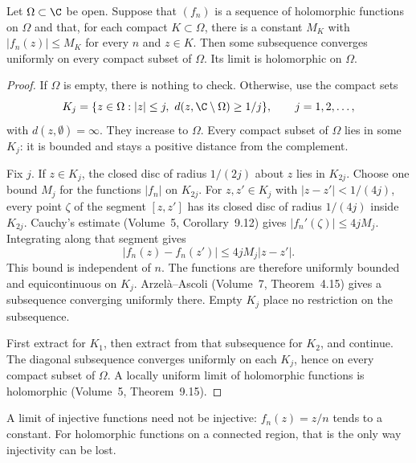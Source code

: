 \begin{theorem}[Montel, 1907]\label{thm:montel}
Let $\Omega\subset\C$ be open. Suppose that $(f_n)$ is a sequence of
holomorphic functions on $\Omega$ and that, for each compact $K\subset\Omega$,
there is a constant $M_K$ with $|f_n(z)|\le M_K$ for every $n$ and $z\in K$.
Then some subsequence converges uniformly on every compact subset of
$\Omega$. Its limit is holomorphic on $\Omega$.
\end{theorem}
\begin{proof}
If $\Omega$ is empty, there is nothing to check. Otherwise, use the compact sets
\[
 K_j=\{z\in\Omega:|z|\le j,\ d(z,\C\setminus\Omega)\ge1/j\},
 \qquad j=1,2,\ldots,
\]
with $d(z,\emptyset)=\infty$. They increase to $\Omega$. Every compact
subset of $\Omega$ lies in some $K_j$: it is bounded and stays a positive
distance from the complement.

Fix $j$. If $z\in K_j$, the closed disc of radius $1/(2j)$ about $z$ lies
in $K_{2j}$. Choose one bound $M_j$ for the functions $|f_n|$ on $K_{2j}$.
For $z,z'\in K_j$ with $|z-z'|<1/(4j)$, every point $\zeta$ of the
segment $[z,z']$ has its closed disc of radius $1/(4j)$ inside $K_{2j}$.
Cauchy's estimate (Volume~5, Corollary~9.12) gives
$|f_n'(\zeta)|\le4jM_j$. Integrating along that segment gives
\[
 |f_n(z)-f_n(z')|\le4jM_j|z-z'|.
\]
This bound is independent of $n$. The functions are therefore uniformly
bounded and equicontinuous on $K_j$. Arzel\`a--Ascoli (Volume~7,
Theorem~4.15) gives a subsequence converging uniformly there. Empty $K_j$
place no restriction on the subsequence.

First extract for $K_1$, then extract from that subsequence for $K_2$, and
continue. The diagonal subsequence converges uniformly on each $K_j$,
hence on every compact subset of $\Omega$. A locally uniform limit of
holomorphic functions is holomorphic (Volume~5, Theorem~9.15).
\end{proof}

A limit of injective functions need not be injective: $f_n(z)=z/n$ tends
to a constant. For holomorphic functions on a connected region, that is the
only way injectivity can be lost.

